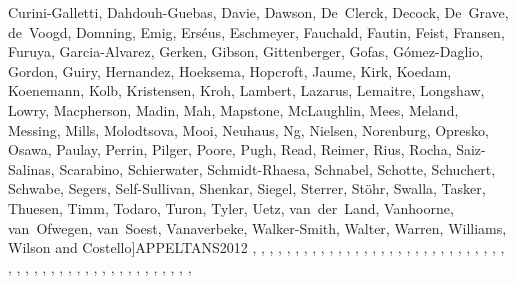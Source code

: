 \documentclass[12pt,authoryear]{elsarticle}
\begin{document}
\begin{thebibliography}{73}
{{  Curini-Galletti, Dahdouh-Guebas, Davie, Dawson, De Clerck, Decock,
  De Grave, de Voogd, Domning, Emig, Erséus, Eschmeyer, Fauchald, Fautin,
  Feist, Fransen, Furuya, Garcia-Alvarez, Gerken, Gibson, Gittenberger, Gofas,
  Gómez-Daglio, Gordon, Guiry, Hernandez, Hoeksema, Hopcroft, Jaume, Kirk,
  Koedam, Koenemann, Kolb, Kristensen, Kroh, Lambert, Lazarus, Lemaitre,
  Longshaw, Lowry, Macpherson, Madin, Mah, Mapstone, McLaughlin, Mees, Meland,
  Messing, Mills, Molodtsova, Mooi, Neuhaus, Ng, Nielsen, Norenburg, Opresko,
  Osawa, Paulay, Perrin, Pilger, Poore, Pugh, Read, Reimer, Rius, Rocha,
  Saiz-Salinas, Scarabino, Schierwater, Schmidt-Rhaesa, Schnabel, Schotte,
  Schuchert, Schwabe, Segers, Self-Sullivan, Shenkar, Siegel, Sterrer, Stöhr,
  Swalla, Tasker, Thuesen, Timm, Todaro, Turon, Tyler, Uetz, van der Land,
  Vanhoorne, van Ofwegen, van Soest, Vanaverbeke, Walker-Smith, Walter,
  Warren, Williams, Wilson and Costello}]{APPELTANS2012}
, ,
  , ,
  , ,
  , ,
  , ,
  , ,
  , ,
  , ,
  , ,
  , ,
  , ,
  , ,
  , ,
  , ,
  , ,
  , ,
  , ,
  , ,
  , ,
  , ,
  , ,
  , ,
  , ,
  , ,
  , ,
  , ,
}
\end{thebibliography}
\end{document}

